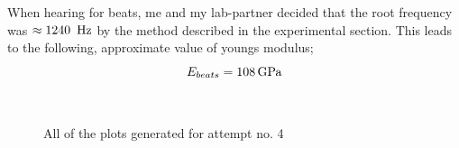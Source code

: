 \documentclass[11pt,a4paper]{article}
\begin{document}
    When hearing for beats, me and my lab-partner decided that the root frequency was $\approx 1240\enspace\textup{Hz}$ by the method described in the experimental section. This leads to the following, approximate value of youngs modulus;
    \begin{equation}
      E_{beats} = 108\,\textup{GPa}
    \end{equation}
    \newline
    \begin{figure}[H]
      \centering
       \\
      \caption{All of the plots generated for attempt no. 4}
      \label{fig:sound_exp1}
    \end{figure}
\end{document}
